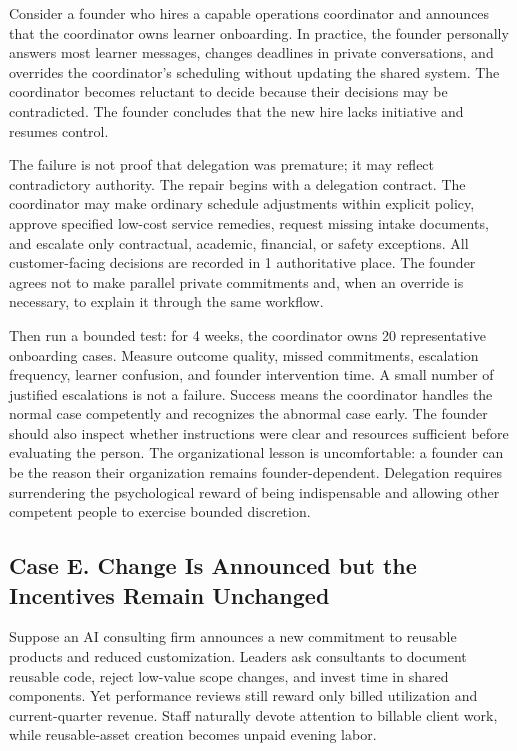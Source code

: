 Consider a founder who hires a capable operations coordinator and announces that the coordinator owns learner onboarding. In practice, the founder personally answers most learner messages, changes deadlines in private conversations, and overrides the coordinator's scheduling without updating the shared system. The coordinator becomes reluctant to decide because their decisions may be contradicted. The founder concludes that the new hire lacks initiative and resumes control.

The failure is not proof that delegation was premature; it may reflect contradictory authority. The repair begins with a delegation contract. The coordinator may make ordinary schedule adjustments within explicit policy, approve specified low-cost service remedies, request missing intake documents, and escalate only contractual, academic, financial, or safety exceptions. All customer-facing decisions are recorded in 1 authoritative place. The founder agrees not to make parallel private commitments and, when an override is necessary, to explain it through the same workflow.

Then run a bounded test: for 4 weeks, the coordinator owns 20 representative onboarding cases. Measure outcome quality, missed commitments, escalation frequency, learner confusion, and founder intervention time. A small number of justified escalations is not a failure. Success means the coordinator handles the normal case competently and recognizes the abnormal case early. The founder should also inspect whether instructions were clear and resources sufficient before evaluating the person. The organizational lesson is uncomfortable: a founder can be the reason their organization remains founder-dependent. Delegation requires surrendering the psychological reward of being indispensable and allowing other competent people to exercise bounded discretion.

\subsection*{Case E. Change Is Announced but the Incentives Remain Unchanged}

Suppose an AI consulting firm announces a new commitment to reusable products and reduced customization. Leaders ask consultants to document reusable code, reject low-value scope changes, and invest time in shared components. Yet performance reviews still reward only billed utilization and current-quarter revenue. Staff naturally devote attention to billable client work, while reusable-asset creation becomes unpaid evening labor.

